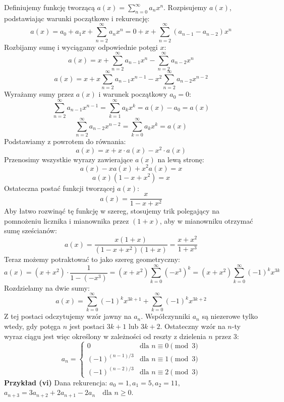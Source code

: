 \documentclass{mwart}
\begin{document}
\begin{mdframed}
    Definiujemy funkcję tworzącą $a(x) = \sum_{n=0}^{\infty} a_n x^n$.
    Rozpisujemy $a(x)$, podstawiając warunki początkowe i rekurencję:
    $$ a(x) = a_0 + a_1 x + \sum_{n=2}^{\infty} a_n x^n = 0 + x + \sum_{n=2}^{\infty} (a_{n-1} - a_{n-2}) x^n $$
    Rozbijamy sumę i wyciągamy odpowiednie potęgi $x$:
    $$ a(x) = x + \sum_{n=2}^{\infty} a_{n-1}x^n - \sum_{n=2}^{\infty} a_{n-2}x^n $$
    $$ a(x) = x + x\sum_{n=2}^{\infty} a_{n-1}x^{n-1} - x^2\sum_{n=2}^{\infty} a_{n-2}x^{n-2} $$
    Wyrażamy sumy przez $a(x)$ i warunek początkowy $a_0 = 0$:
    $$ \sum_{n=2}^{\infty} a_{n-1}x^{n-1} = \sum_{k=1}^{\infty} a_k x^k = a(x) - a_0 = a(x) $$
    $$ \sum_{n=2}^{\infty} a_{n-2}x^{n-2} = \sum_{k=0}^{\infty} a_k x^k = a(x) $$
    Podstawiamy z powrotem do równania:
    $$ a(x) = x + x \cdot a(x) - x^2 \cdot a(x) $$
    Przenosimy wszystkie wyrazy zawierające $a(x)$ na lewą stronę:
    $$ a(x) - x a(x) + x^2 a(x) = x $$
    $$ a(x) (1 - x + x^2) = x $$
    Ostateczna postać funkcji tworzącej $a(x)$:
    $$ a(x) = \frac{x}{1 - x + x^2} $$
    Aby łatwo rozwinąć tę funkcję w szereg, stosujemy trik polegający na pomnożeniu licznika i mianownika przez $(1+x)$, aby w mianowniku otrzymać sumę sześcianów:
    $$ a(x) = \frac{x(1+x)}{(1 - x + x^2)(1+x)} = \frac{x+x^2}{1+x^3} $$
    Teraz możemy potraktować to jako szereg geometryczny:
    $$ a(x) = (x+x^2) \cdot \frac{1}{1 - (-x^3)} = (x+x^2) \sum_{k=0}^{\infty} (-x^3)^k = (x+x^2) \sum_{k=0}^{\infty} (-1)^k x^{3k} $$
    Rozdzielamy na dwie sumy:
    $$ a(x) = \sum_{k=0}^{\infty} (-1)^k x^{3k+1} + \sum_{k=0}^{\infty} (-1)^k x^{3k+2} $$
    Z tej postaci odczytujemy wzór jawny na $a_n$. Współczynniki $a_n$ są niezerowe tylko wtedy, gdy potęga $n$ jest postaci $3k+1$ lub $3k+2$.
    Ostateczny wzór na $n$-ty wyraz ciągu jest więc określony w zależności od reszty z dzielenia $n$ przez 3:
    $$
    a_n =
    \begin{cases}
    0 & \text{dla } n \equiv 0 \pmod{3} \\
    (-1)^{(n-1)/3} & \text{dla } n \equiv 1 \pmod{3} \\
    (-1)^{(n-2)/3} & \text{dla } n \equiv 2 \pmod{3}
    \end{cases}
    $$
    \textbf{Przykład (vi)} \newline
    Dana rekurencja:
    $a_0 = 1, a_1 = 5, a_2 = 11,$
    $a_{n+3} = 3a_{n+2} + 2a_{n+1} -2a_n \quad \text{dla } n \ge 0.$


\end{mdframed}
\end{document}
